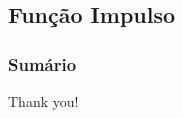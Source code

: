 \documentclass[mathserif]{beamer}
\begin{document}
\subsection{Função Impulso}
\begin{frame}
\frametitle{Sumário}
\small
\tableofcontents[currentsubsection]
\end{frame}

\begin{frame}[noframenumbering]
	\vfill
	\centering
	\Huge{Thank you!}
	\vfill
\end{frame}
\end{document}
